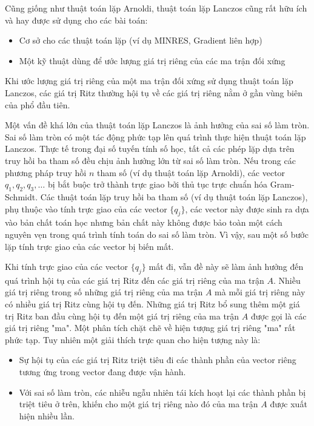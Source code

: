 \documentclass[14pt, a4paper]{article}
\numberwithin{equation}{section}
\numberwithin{algorithm}{section}
\numberwithin{figure}{section}
\numberwithin{dl}{section}
\numberwithin{md}{section}
\numberwithin{bd}{section}
\begin{document}
Cũng giống như thuật toán lặp Arnoldi, thuật toán lặp Lanczos cũng rất hữu ích và hay được sử dụng cho các bài toán:

\begin{itemize}
    \item Cơ sở cho các thuật toán lặp (ví dụ MINRES, Gradient liên hợp)
    \item Một kỹ thuật dùng để ước lượng giá trị riêng của các ma trận đối xứng
\end{itemize}

Khi ước lượng giá trị riêng của một ma trận đối xứng sử dụng thuật toán lặp Lanczos, các giá trị Ritz thường hội tụ về các giá trị riêng nằm ở gần vùng biên của phổ đầu tiên. 

Một vấn đề khá lớn của thuật toán lặp Lanczos là ảnh hưởng của sai số làm tròn.
Sai số làm tròn có một tác động phức tạp lên quá trình thực hiện thuật toán lặp Lanczos. Thực tế trong đại số tuyến tính số học, tất cả các phép lặp dựa trên truy hồi ba tham số đều chịu ảnh hưởng lớn từ sai số làm tròn.
Nếu trong các phương pháp truy hồi $n$ tham số (ví dụ thuật toán lặp Arnoldi), các vector $q_1, q_2, q_3, \dots$ bị bắt buộc trở thành trực giao bởi thủ tục trực chuẩn hóa Gram-Schmidt. Các thuật toán lặp truy hồi ba tham số (ví dụ thuật toán lặp Lanczos), phụ thuộc vào tính trực giao của các vector $\lbrace q_j \rbrace$, các vector này được sinh ra dựa vào bản chất toán học nhưng bản chất này không được bảo toàn một cách nguyên vẹn trong quá trình tính toán do sai số làm tròn. Vì vậy, sau một số bước lặp tính trực giao của các vector bị biến mất.

Khi tính trực giao của các vector $\lbrace q_j \rbrace$ mất đi, vẫn đề này sẽ làm ảnh hưởng đến quá trình hội tụ của các giá trị Ritz đến các giá trị riêng của ma trận $A$. Nhiều giá trị riêng trong số những giá trị riêng của ma trận $A$ mà mỗi giá trị riêng này có nhiều giá trị Ritz cùng hội tụ đến. Những giá trị Ritz bổ sung thêm một giá trị Ritz ban đầu cùng hội tụ đến một giá trị riêng của ma trận $A$ được gọi là các giá trị riêng "ma".
Một phân tích chặt chẽ về hiện tượng giá trị riêng "ma" rất phức tạp. Tuy nhiên một giải thích trực quan cho hiện tượng này là:

\begin{itemize}
    \item Sự hội tụ của các giá trị Ritz triệt tiêu đi các thành phần của vector riêng tương ứng trong vector đang được vận hành.
    \item Với sai số làm tròn, các nhiễu ngẫu nhiên tái kích hoạt lại các thành phần bị triệt tiêu ở trên, khiến cho một giá trị riêng nào đó của ma trận $A$ được xuất hiện nhiều lần.
\end{itemize}
\end{document}
